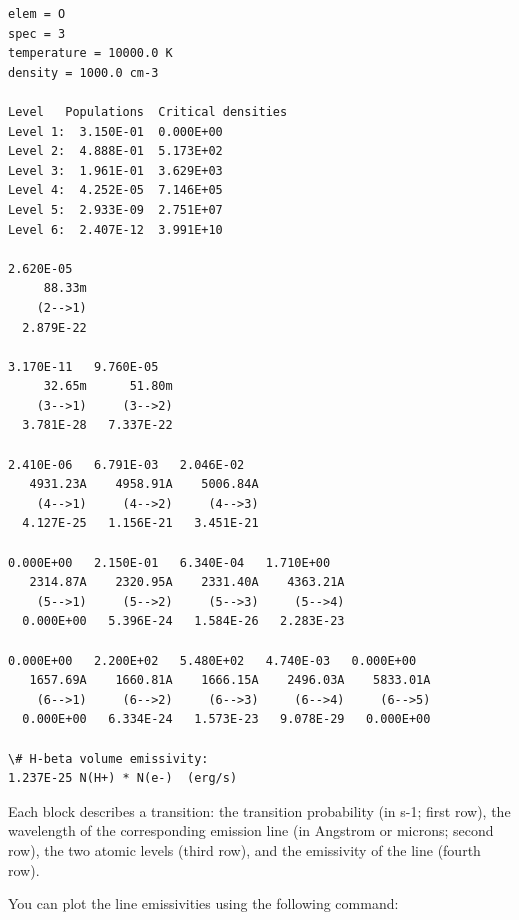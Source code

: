 \documentclass{report}
\begin{document}
    \begin{Verbatim}[commandchars=\\\{\}]
elem = O
spec = 3
temperature = 10000.0 K
density = 1000.0 cm-3

Level   Populations  Critical densities
Level 1:  3.150E-01  0.000E+00
Level 2:  4.888E-01  5.173E+02
Level 3:  1.961E-01  3.629E+03
Level 4:  4.252E-05  7.146E+05
Level 5:  2.933E-09  2.751E+07
Level 6:  2.407E-12  3.991E+10

2.620E-05   
     88.33m 
    (2-->1) 
  2.879E-22 

3.170E-11   9.760E-05   
     32.65m      51.80m 
    (3-->1)     (3-->2) 
  3.781E-28   7.337E-22 

2.410E-06   6.791E-03   2.046E-02   
   4931.23A    4958.91A    5006.84A 
    (4-->1)     (4-->2)     (4-->3) 
  4.127E-25   1.156E-21   3.451E-21 

0.000E+00   2.150E-01   6.340E-04   1.710E+00   
   2314.87A    2320.95A    2331.40A    4363.21A 
    (5-->1)     (5-->2)     (5-->3)     (5-->4) 
  0.000E+00   5.396E-24   1.584E-26   2.283E-23 

0.000E+00   2.200E+02   5.480E+02   4.740E-03   0.000E+00   
   1657.69A    1660.81A    1666.15A    2496.03A    5833.01A 
    (6-->1)     (6-->2)     (6-->3)     (6-->4)     (6-->5) 
  0.000E+00   6.334E-24   1.573E-23   9.078E-29   0.000E+00 

\# H-beta volume emissivity:
1.237E-25 N(H+) * N(e-)  (erg/s)

    \end{Verbatim}

Each block describes a transition: the transition probability (in s-1;
first row), the wavelength of the corresponding emission line (in
Angstrom or microns; second row), the two atomic levels (third row), and
the emissivity of the line (fourth row).

You can plot the line emissivities using the following command:
\end{document}
